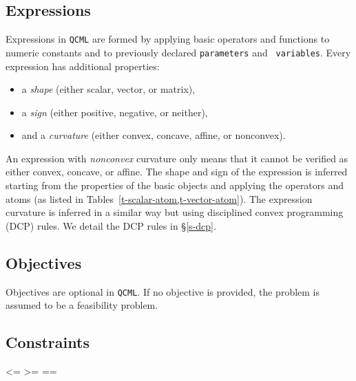 \documentclass[11pt]{article}
\def\qcml{\texttt{QCML}\xspace}
\newcommand{\reals}{{\mbox{\bf R}}}
\begin{document}
\subsection{Expressions}
Expressions in \qcml are formed by applying basic operators and functions to
numeric constants and to previously declared {\tt parameters} and {\tt
variables}. Every expression has additional properties:
\begin{itemize}
\item a \emph{shape} (either scalar, vector, or matrix),
\item a \emph{sign} (either positive, negative, or neither),
\item and a \emph{curvature} (either convex, concave, affine, or nonconvex).
\end{itemize}
An expression with \emph{nonconvex} curvature only means that it cannot be
verified as either convex, concave, or affine. The shape and sign of the
expression is inferred starting from the properties of the basic objects and
applying the operators and atoms (as listed in
Tables~\ref{t-scalar-atom,t-vector-atom}). The expression curvature is
inferred in a similar way but using disciplined convex programming (DCP)
rules. We detail the DCP rules in \S\ref{s-dcp}.


% 
% 
% 
% 
% 


\subsection{Objectives}
Objectives are optional in \qcml. If no objective is provided, the problem
is assumed to be a feasibility problem.

\subsection{Constraints}
<=
>=
==
\end{document}
